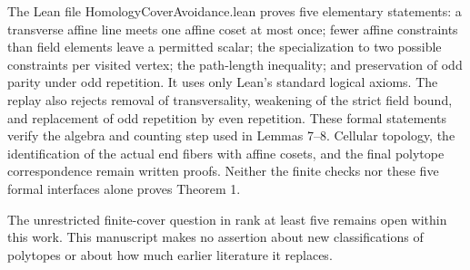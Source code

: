 \documentclass[
  11pt,
  a4paper,
]{article}
\begin{document}
The Lean file HomologyCoverAvoidance.lean proves five elementary
statements: a transverse affine line meets one affine coset at most
once; fewer affine constraints than field elements leave a permitted
scalar; the specialization to two possible constraints per visited
vertex; the path-length inequality; and preservation of odd parity under
odd repetition. It uses only Lean's standard logical axioms. The replay
also rejects removal of transversality, weakening of the strict field
bound, and replacement of odd repetition by even repetition. These
formal statements verify the algebra and counting step used in Lemmas
7--8. Cellular topology, the identification of the actual end fibers
with affine cosets, and the final polytope correspondence remain written
proofs. Neither the finite checks nor these five formal interfaces alone
proves Theorem 1.

The unrestricted finite-cover question in rank at least five remains
open within this work. This manuscript makes no assertion about new
classifications of polytopes or about how much earlier literature it
replaces.
\end{document}
